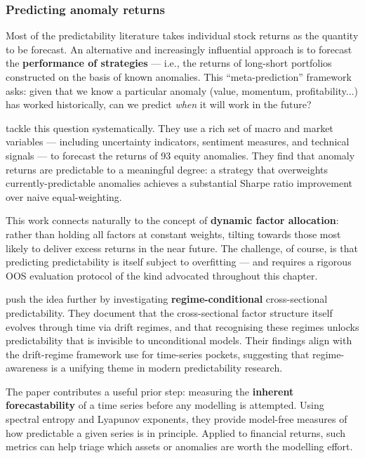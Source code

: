 \subsubsection{Predicting anomaly returns}\label{sec_pred_anomalies}

Most of the predictability literature takes individual stock returns as the quantity to be forecast. An alternative and increasingly influential approach is to forecast the \textbf{performance of strategies} --- i.e., the returns of long-short portfolios constructed on the basis of known anomalies. This ``meta-prediction'' framework asks: given that we know a particular anomaly (value, momentum, profitability...) has worked historically, can we predict \textit{when} it will work in the future?

\cite{bowles2024predicting} tackle this question systematically. They use a rich set of macro and market variables --- including uncertainty indicators, sentiment measures, and technical signals --- to forecast the returns of 93 equity anomalies. They find that anomaly returns are predictable to a meaningful degree: a strategy that overweights currently-predictable anomalies achieves a substantial Sharpe ratio improvement over naive equal-weighting.

This work connects naturally to the concept of \textbf{dynamic factor allocation}: rather than holding all factors at constant weights, tilting towards those most likely to deliver excess returns in the near future. The challenge, of course, is that predicting predictability is itself subject to overfitting --- and requires a rigorous OOS evaluation protocol of the kind advocated throughout this chapter.

\cite{singha2025discovery} push the idea further by investigating \textbf{regime-conditional} cross-sectional predictability. They document that the cross-sectional factor structure itself evolves through time via drift regimes, and that recognising these regimes unlocks predictability that is invisible to unconditional models. Their findings align with the drift-regime framework \cite{farmer2019pockets} use for time-series pockets, suggesting that regime-awareness is a unifying theme in modern predictability research.

The \cite{wang2025forecastability} paper contributes a useful prior step: measuring the \textbf{inherent forecastability} of a time series before any modelling is attempted. Using spectral entropy and Lyapunov exponents, they provide model-free measures of how predictable a given series is in principle. Applied to financial returns, such metrics can help triage which assets or anomalies are worth the modelling effort.

